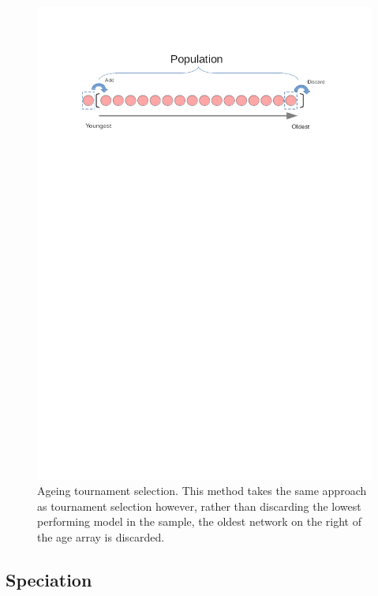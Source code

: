 \documentclass{article}
\begin{document}
	\begin{figure}[h]
	
		\centering 
		\includegraphics[trim= 100 750 100 0 ,scale=0.35]{aging.png}


		\caption{Ageing tournament selection. This method takes the same approach as tournament selection however, rather than discarding the lowest performing model in the sample, the oldest network on the right of the age array is discarded.}
		\label{fig:GA2}


	\end{figure}

	\subsection{Speciation}
\end{document}
